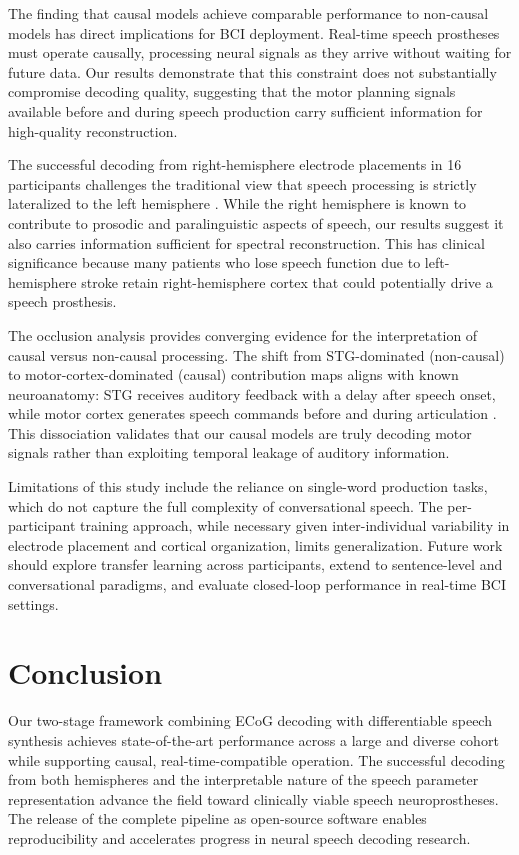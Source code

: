 \documentclass[11pt]{article}
\begin{document}
The finding that causal models achieve comparable performance to non-causal models has direct implications for BCI deployment. Real-time speech prostheses must operate causally, processing neural signals as they arrive without waiting for future data. Our results demonstrate that this constraint does not substantially compromise decoding quality, suggesting that the motor planning signals available before and during speech production carry sufficient information for high-quality reconstruction.

The successful decoding from right-hemisphere electrode placements in 16 participants challenges the traditional view that speech processing is strictly lateralized to the left hemisphere \citep{hickok2007}. While the right hemisphere is known to contribute to prosodic and paralinguistic aspects of speech, our results suggest it also carries information sufficient for spectral reconstruction. This has clinical significance because many patients who lose speech function due to left-hemisphere stroke retain right-hemisphere cortex that could potentially drive a speech prosthesis.

The occlusion analysis provides converging evidence for the interpretation of causal versus non-causal processing. The shift from STG-dominated (non-causal) to motor-cortex-dominated (causal) contribution maps aligns with known neuroanatomy: STG receives auditory feedback with a delay after speech onset, while motor cortex generates speech commands before and during articulation \citep{bouchard2013,chartier2018}. This dissociation validates that our causal models are truly decoding motor signals rather than exploiting temporal leakage of auditory information.

Limitations of this study include the reliance on single-word production tasks, which do not capture the full complexity of conversational speech. The per-participant training approach, while necessary given inter-individual variability in electrode placement and cortical organization, limits generalization. Future work should explore transfer learning across participants, extend to sentence-level and conversational paradigms, and evaluate closed-loop performance in real-time BCI settings.

\section{Conclusion}

Our two-stage framework combining ECoG decoding with differentiable speech synthesis achieves state-of-the-art performance across a large and diverse cohort while supporting causal, real-time-compatible operation. The successful decoding from both hemispheres and the interpretable nature of the speech parameter representation advance the field toward clinically viable speech neuroprostheses. The release of the complete pipeline as open-source software enables reproducibility and accelerates progress in neural speech decoding research.



\end{document}
